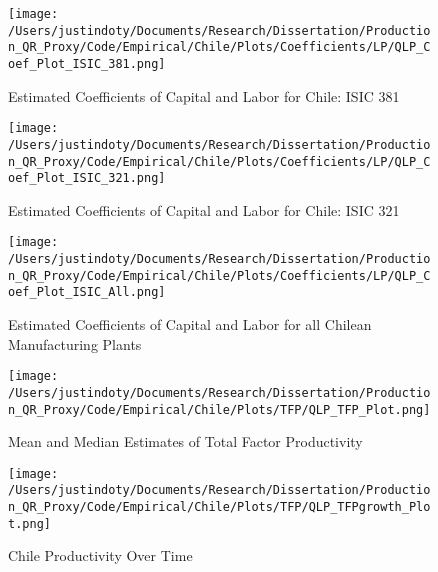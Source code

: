 \documentclass[11pt]{article}
\begin{document}
\begin{figure}[H]
\centering
\caption{Estimated Coefficients of Capital and Labor for Chile: ISIC 381}
\texttt{[image: /Users/justindoty/Documents/Research/Dissertation/Production\_QR\_Proxy/Code/Empirical/Chile/Plots/Coefficients/LP/QLP\_Coef\_Plot\_ISIC\_381.png]}
\label{fig:LPCHL381}
\end{figure}

\begin{figure}[H]
\centering
\caption{Estimated Coefficients of Capital and Labor for Chile: ISIC 321}
\texttt{[image: /Users/justindoty/Documents/Research/Dissertation/Production\_QR\_Proxy/Code/Empirical/Chile/Plots/Coefficients/LP/QLP\_Coef\_Plot\_ISIC\_321.png]}
\label{fig:LPCHL321}
\end{figure}

\begin{figure}[H]
\centering
\caption{Estimated Coefficients of Capital and Labor for all Chilean Manufacturing Plants}
\texttt{[image: /Users/justindoty/Documents/Research/Dissertation/Production\_QR\_Proxy/Code/Empirical/Chile/Plots/Coefficients/LP/QLP\_Coef\_Plot\_ISIC\_All.png]}
\label{fig:LPCHLall}
\end{figure}

\begin{figure}[H]
\centering
\caption{Mean and Median Estimates of Total Factor Productivity}
\texttt{[image: /Users/justindoty/Documents/Research/Dissertation/Production\_QR\_Proxy/Code/Empirical/Chile/Plots/TFP/QLP\_TFP\_Plot.png]}
\label{fig:LPTFPDens}
\end{figure}

\begin{figure}[H]
\centering
\caption{Chile Productivity Over Time}
\texttt{[image: /Users/justindoty/Documents/Research/Dissertation/Production\_QR\_Proxy/Code/Empirical/Chile/Plots/TFP/QLP\_TFPgrowth\_Plot.png]}
\label{fig:LPCHLpgrowth}
\end{figure}
\end{document}
